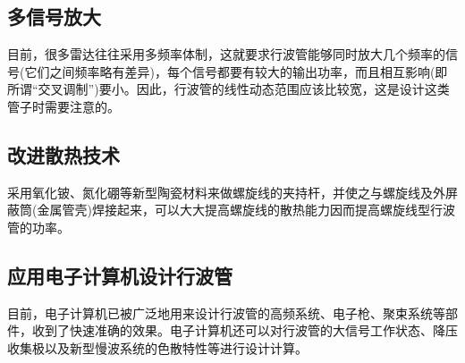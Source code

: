 \subsection{多信号放大}
目前，很多雷达往往采用多频率体制，这就要求行波管能够同时放大几个频率的信号(它们之间频率略有差异)，每个信号都要有较大的输出功率，而且相互影响(即所谓“交叉调制”)要小。因此，行波管的线性动态范围应该比较宽，这是设计这类管子时需要注意的。
\subsection{改进散热技术}
采用氧化铍、氮化硼等新型陶瓷材料来做螺旋线的夹持杆，并使之与螺旋线及外屏蔽筒(金属管壳)焊接起来，可以大大提高螺旋线的散热能力因而提高螺旋线型行波管的功率。
\subsection{应用电子计算机设计行波管}
目前，电子计算机已被广泛地用来设计行波管的高频系统、电子枪、聚束系统等部件，收到了快速准确的效果。电子计算机还可以对行波管的大信号工作状态、降压收集极以及新型慢波系统的色散特性等进行设计计算。